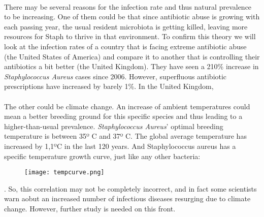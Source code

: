 \paragraph{}There may be several reasons for the infection rate and thus natural prevalence to be increasing. One of them could be that since antibiotic abuse is growing with each passing year, the usual resident microbiota is getting killed, leaving more resources for Staph to thrive in that environment. To confirm this theory we will look at the infection rates of a country that is facing extreme antibiotic abuse (the United States of America) and compare it to another that is controlling their antibiotics a bit better (the United Kingdom). They have seen a 210\% increase in \emph{Staphylococcus Aureus} cases since 2006. However, superfluous antibiotic prescriptions have increased by barely 1\%\cite{baggsEstimatingNationalTrends2016}. In the United Kingdom,
\paragraph{}The other could be climate change. An increase of ambient temperatures could mean a better breeding ground for this specific species and thus leading to a higher-than-usual prevalence. \emph{Staphylococcus Aureus}' optimal breeding temperature is between 35º C and 37º C. The global average temperature has increased by 1,1ºC\cite{gmsGMSAnnualGlobal2016} in the last 120 years. And Staphylococcus aureus has a specific temperature growth curve, just like any other bacteria: \begin{center}\begin{figure}\texttt{[image: tempcurve.png]}\end{figure}\end{center}. So, this correlation may not be completely incorrect, and in fact some scientists warn aobut an increased number of infectious diseases resurging due to climate change. However, further study is needed on this front.
